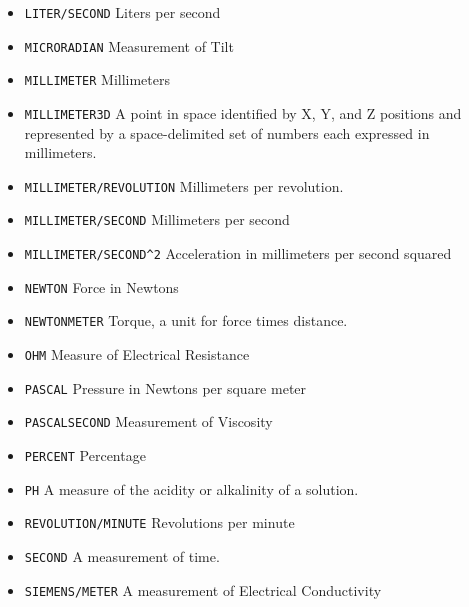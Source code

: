 \begin{itemize}
\begin{itemize}
\item \texttt{LITER/SECOND} \newline Liters per second 
\item \texttt{MICRO\textunderscore RADIAN} \newline Measurement of Tilt 
\item \texttt{MILLIMETER} \newline Millimeters 
\item \texttt{MILLIMETER\textunderscore 3D} \newline A point in space identified by X, Y, and Z positions and represented by a space-delimited set of numbers each expressed in millimeters. 
\item \texttt{MILLIMETER/REVOLUTION} \newline Millimeters per revolution. 
\item \texttt{MILLIMETER/SECOND} \newline Millimeters per second 
\item \texttt{MILLIMETER/SECOND\^{}2} \newline Acceleration in millimeters per second squared 
\item \texttt{NEWTON} \newline Force in Newtons 
\item \texttt{NEWTON\textunderscore METER} \newline Torque, a unit for force times distance. 
\item \texttt{OHM} \newline Measure of Electrical Resistance 
\item \texttt{PASCAL} \newline Pressure in Newtons per square meter 
\item \texttt{PASCAL\textunderscore SECOND} \newline Measurement of Viscosity 
\item \texttt{PERCENT} \newline Percentage 
\item \texttt{PH} \newline A measure of the acidity or alkalinity of a solution. 
\item \texttt{REVOLUTION/MINUTE} \newline Revolutions per minute 
\item \texttt{SECOND} \newline A measurement of time. 
\item \texttt{SIEMENS/METER} \newline A measurement of Electrical Conductivity 

\end{itemize}
\end{itemize}
